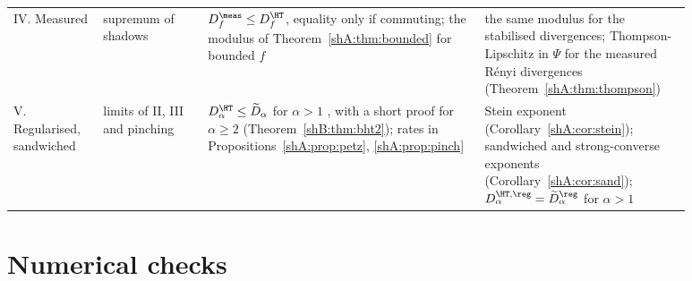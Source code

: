 {\begin{longtable}{>{\raggedright\arraybackslash}p{0.12\linewidth}>{\raggedright\arraybackslash}p{0.14\linewidth}>{\raggedright\arraybackslash}p{0.37\linewidth}>{\raggedright\arraybackslash}p{0.25\linewidth}}
IV. Measured & supremum of shadows & $D^\meas_f\le D^\HT_f$, equality only if commuting; the modulus of Theorem~\ref{shA:thm:bounded} for bounded $f$ & the same modulus for the stabilised divergences; Thompson-Lipschitz in $\Psi$ for the measured R\'enyi divergences (Theorem~\ref{shA:thm:thompson})\\
V. Regularised, sandwiched & limits of II, III and pinching & $D^\HT_\alpha\le\widetilde D_\alpha$ for $\alpha>1$ \cite{LiuHircheCheng2025}, with a short proof for $\alpha\ge2$ (Theorem~\ref{shB:thm:bht2}); rates in Propositions~\ref{shA:prop:petz}, \ref{shA:prop:pinch} & Stein exponent (Corollary~\ref{shA:cor:stein}); sandwiched and strong-converse exponents (Corollary~\ref{shA:cor:sand}); $D^{\HT,\reg}_\alpha=\widetilde D^\reg_\alpha$ for $\alpha>1$\\
\end{longtable}
}

\section{Numerical checks}\label{shA:sec:numerics}

